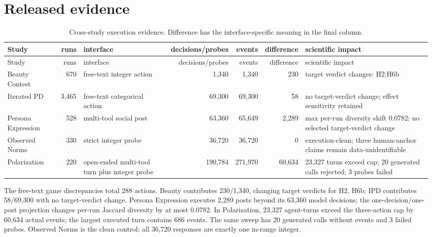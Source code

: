 \documentclass[10pt]{article}
\begin{document}
\section{Released evidence}
\begin{landscape}
\small
\begin{longtable}{@{}l r p{3.2cm} r r r p{6.4cm}@{}}
\caption{Cross-study execution evidence. Difference has the interface-specific meaning in the final column.}\\
\toprule
Study & runs & interface & decisions/probes & events & difference & scientific impact \\
\midrule
\endfirsthead
\toprule
Study & runs & interface & decisions/probes & events & difference & scientific impact \\
\midrule
\endhead
Beauty Contest & 670 & free-text integer action & 1,340 & 1,340 & 230 & target verdict changes: H2;H6b \\
Iterated PD & 3,465 & free-text categorical action & 69,300 & 69,300 & 58 & no target-verdict change; effect sensitivity retained \\
Persona Expression & 528 & multi-tool social post & 63,360 & 65,649 & 2,289 & max per-run diversity shift 0.0782; no selected target-verdict change \\
Observed Norms & 330 & strict integer probe & 36,720 & 36,720 & 0 & execution-clean; three human-anchor claims remain data-unidentifiable \\
Polarization & 220 & open-ended multi-tool turn plus integer probe & 190,784 & 271,970 & 60,634 & 23,327 turns exceed cap; 20 generated calls rejected; 3 probes failed \\
\bottomrule
\end{longtable}
\end{landscape}

The free-text game discrepancies total 288 actions. Beauty contributes 230/1,340, changing target verdicts for H2, H6b; IPD contributes 58/69,300 with no target-verdict change. Persona Expression executes 2,289 posts beyond its 63,360 model decisions; the one-decision/one-post projection changes per-run Jaccard diversity by at most 0.0782. In Polarization, 23,327 agent-turns exceed the three-action cap by 60,634 actual events; the largest executed turn contains 686 events. The same sweep has 20 generated calls without events and 3 failed probes. Observed Norms is the clean control: all 36,720 responses are exactly one in-range integer.
\end{document}
